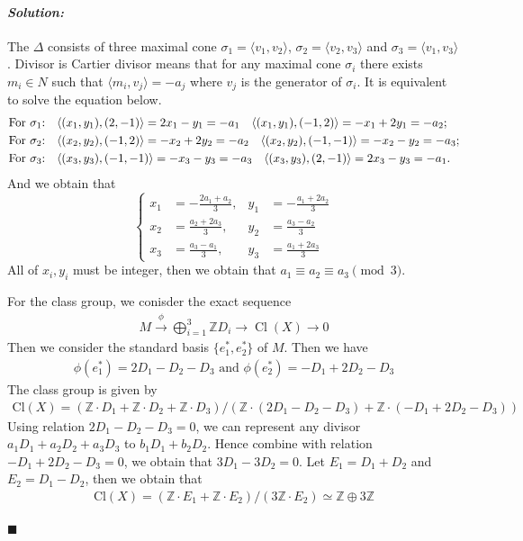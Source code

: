 \documentclass[12pt, a4paper]{article}
\newenvironment{solution}
  {\paragraph{\textit{Solution:}}\par\medskip}
  {\hfill$\blacksquare$\vspace{0.1cm}}
\begin{document}
\begin{solution}
    The $\Delta$ consists of three maximal cone $\sigma_1=\langle v_1,v_2\rangle$, $\sigma_2=\langle v_2,v_3\rangle$ and $\sigma_3=\langle v_1,v_3\rangle$. 
    Divisor is Cartier divisor means that for any maximal cone $\sigma_i$ there exists $m_{i}\in N$ such that $\langle m_i,v_{j}\rangle = -a_j$ where $v_j$ is the generator of $\sigma_i$.
    It is equivalent to solve the equation below.
    \begin{align*}
        &\text{For $\sigma_1$:\quad } \langle (x_1, y_1), (2, -1) \rangle = 2x_1 - y_1 = -a_1 \quad \langle (x_1, y_1), (-1, 2) \rangle = -x_1 + 2y_1 = -a_2;\\
        &\text{For $\sigma_2$:\quad } \langle (x_2, y_2), (-1, 2) \rangle = -x_2 + 2y_2 = -a_2 \quad  \langle (x_2, y_2), (-1, -1) \rangle = -x_2 - y_2 = -a_3;\\
        &\text{For $\sigma_3$:\quad } \langle (x_3, y_3), (-1, -1) \rangle = -x_3 - y_3 = -a_3\quad \langle (x_3, y_3), (2, -1) \rangle = 2x_3 - y_3 = -a_1.
    \end{align*}
    And we obtain that 
\[
\left\{
\begin{aligned}
    x_1 &= -\frac{2a_1 + a_2}{3}, & y_1 &= -\frac{a_1 + 2a_2}{3} \\
    x_2 &= \frac{a_2 + 2a_3}{3},  & y_2 &= \frac{a_3 - a_2}{3}  \\
    x_3 &= \frac{a_3 - a_1}{3},  & y_3 &= \frac{a_1 + 2a_3}{3}
\end{aligned}
\right.
\]
All of $x_i,y_i$ must be integer, then we obtain that $a_1 \equiv a_2 \equiv a_3 \pmod 3$.

For the class group, we conisder the exact sequence 
\begin{align*}
    M \xrightarrow{\phi} \bigoplus_{i=1}^3 \mathbb{Z} D_i \to \operatorname{Cl}(X) \to 0
\end{align*}
Then we consider the standard basis $\{e_1^*,e_2^*\}$ of $M$. Then we have 
\begin{align*}
    \phi(e_1^*) = 2D_1-D_2-D_3\text{ and }\phi(e_2^*) = -D_1+2D_2-D_3
\end{align*} 
The class group is given by 
\begin{align*}
    \text{Cl}(X) = (\mathbb{Z}\cdot D_1+\mathbb{Z}\cdot D_2+\mathbb{Z}\cdot D_3)/(\mathbb{Z}\cdot(2D_1-D_2-D_3)+\mathbb{Z}\cdot(-D_1+2D_2-D_3))
\end{align*}
Using relation $2D_1-D_2-D_3=0$, we can represent any divisor $a_1D_1+a_2D_2+a_3D_3$ to $b_1D_1+b_2D_2$.
Hence combine with relation $-D_1+2D_2-D_3=0$, we obtain that $3D_1-3D_2=0$. Let $E_1=D_1+D_2$ and $E_2=D_1-D_2$, then we obtain that 
\begin{align*}
     \text{Cl}(X) = (\mathbb{Z}\cdot E_1+\mathbb{Z}\cdot E_2)/(3\mathbb{Z}\cdot E_2) \simeq \mathbb{Z}\oplus 3\mathbb{Z}
\end{align*}


\end{solution}
\end{document}

